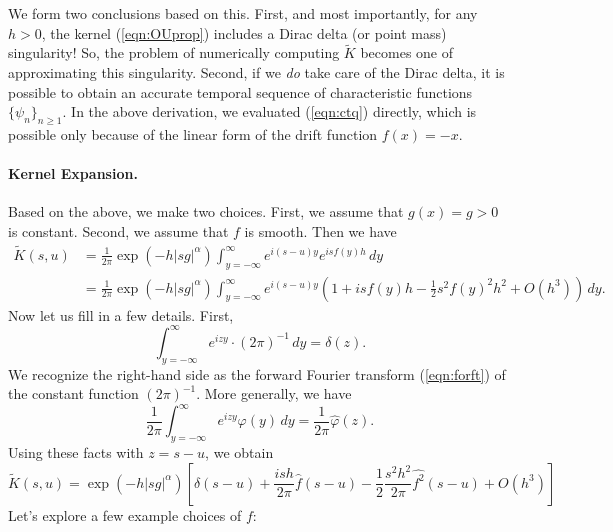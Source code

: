 \documentclass[11pt,letterpaper]{article}
\begin{document}
We form two conclusions based on this.  First, and most importantly, for any $h > 0$, the kernel (\ref{eqn:OUprop}) includes a Dirac delta (or point mass) singularity!  So, the problem of numerically computing $\widetilde{K}$ becomes one of approximating this singularity.  Second, if we \emph{do} take care of the Dirac delta, it is possible to obtain an accurate temporal sequence of characteristic functions $\{ \psi_n \}_{n \geq 1}$.  In the above derivation, we evaluated (\ref{eqn:ctq}) directly, which is possible only because of the linear form of the drift function $f(x) = -x$.

\paragraph{Kernel Expansion.} Based on the above, we make two choices.  First, we assume that $g(x) = g > 0$ is constant.  Second, we assume that $f$ is smooth.  Then we have
\begin{align*}
\widetilde{K}(s,u) &= \frac{1}{2\pi} \exp{\left(  -h |s g|^{\alpha} \right)} \int_{y=-\infty}^{\infty}e^{i(s-u)y} e^{i s f(y) h} \, dy \\
 &= \frac{1}{2\pi} \exp{\left(  -h |s g|^{\alpha} \right)} \int_{y=-\infty}^\infty e^{i(s-u) y} (1 + i s f(y) h - \frac{1}{2} s^2 f(y)^2 h^2 + O(h^3) ) \, dy.
\end{align*}
Now let us fill in a few details. First,
\[
\int_{y=-\infty}^\infty  e^{i z y} \cdot (2 \pi)^{-1} \, dy = \delta(z).
\]
We recognize the right-hand side as the forward Fourier transform (\ref{eqn:forft}) of the constant function $(2 \pi)^{-1}$.  More generally, we have
\[
\frac{1}{2 \pi} \int_{y=-\infty}^\infty e^{i z y} \varphi(y) \, dy = \frac{1}{2 \pi} \widehat{\varphi}(z).
\]
Using these facts with $z = s - u$, we obtain
\begin{equation}
 \label{eqn:kernelexpan}
 \widetilde{K}(s,u) = \exp{\left(  -h |s g|^{\alpha} \right)} \left[ \delta(s-u) + \frac{i s h}{2 \pi} \widehat{f}(s-u) - \frac{1}{2} \frac{s^2 h^2}{2 \pi} \widehat{f^2}(s-u) + O(h^3) \right]
 \end{equation}
Let's explore a few example choices of $f$:
\end{document}
